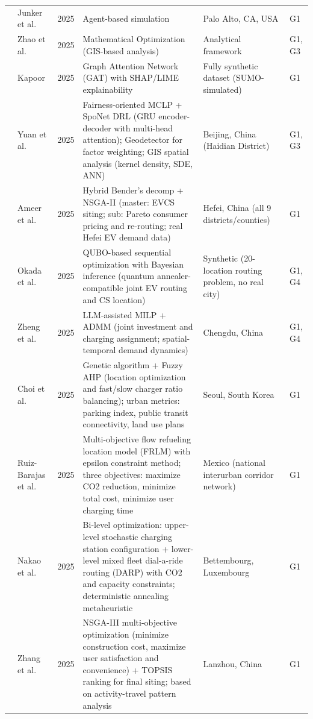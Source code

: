 \documentclass[letterpaper, 12pt, oneside, doublespacing]{Thesis}
\begin{document}
\begin{longtable}{L{0.9cm} L{2.2cm} L{0.8cm} L{3.3cm} L{2.5cm} L{1.5cm}}
\cite{data-driven_optimization_2025} & Junker et al. & 2025 & Agent-based simulation & Palo Alto, CA, USA & G1 \\
\cite{electric_vehicle_2025} & Zhao et al. & 2025 & Mathematical Optimization (GIS-based analysis) & Analytical framework & G1, G3 \\
\cite{explainable_and_2025} & Kapoor & 2025 & Graph Attention Network (GAT) with SHAP/LIME explainability & Fully synthetic dataset (SUMO-simulated) & G1 \\
\cite{fairness-oriented_charging_2025} & Yuan et al. & 2025 & Fairness-oriented MCLP + SpoNet DRL (GRU encoder-decoder with multi-head attention); Geodetector for factor weighting; GIS spatial analysis (kernel density, SDE, ANN) & Beijing, China (Haidian District) & G1, G3 \\
\cite{hybrid_optimization_2025} & Ameer et al. & 2025 & Hybrid Bender's decomp + NSGA-II (master: EVCS siting; sub: Pareto consumer pricing and re-routing; real Hefei EV demand data) & Hefei, China (all 9 districts{\slash}counties) & G1 \\
\cite{joint_optimization_2025} & Okada et al. & 2025 & QUBO-based sequential optimization with Bayesian inference (quantum annealer-compatible joint EV routing and CS location) & Synthetic (20-location routing problem, no real city) & G1, G4 \\
\cite{large_language_2025} & Zheng et al. & 2025 & LLM-assisted MILP + ADMM (joint investment and charging assignment; spatial-temporal demand dynamics) & Chengdu, China & G1, G4 \\
\cite{location_and_2025} & Choi et al. & 2025 & Genetic algorithm + Fuzzy AHP (location optimization and fast/slow charger ratio balancing); urban metrics: parking index, public transit connectivity, land use plans & Seoul, South Korea & G1 \\
\cite{multiobjective_model_2025} & Ruiz-Barajas et al. & 2025 & Multi-objective flow refueling location model (FRLM) with epsilon constraint method; three objectives: maximize CO2 reduction, minimize total cost, minimize user charging time & Mexico (national interurban corridor network) & G1 \\
\cite{optimal_mixed_2025} & Nakao et al. & 2025 & Bi-level optimization: upper-level stochastic charging station configuration + lower-level mixed fleet dial-a-ride routing (DARP) with CO2 and capacity constraints; deterministic annealing metaheuristic & Bettembourg, Luxembourg & G1 \\
\cite{optimization_of_2025} & Zhang et al. & 2025 & NSGA-III multi-objective optimization (minimize construction cost, maximize user satisfaction and convenience) + TOPSIS ranking for final siting; based on activity-travel pattern analysis & Lanzhou, China & G1 \\

\end{longtable}
\end{document}
